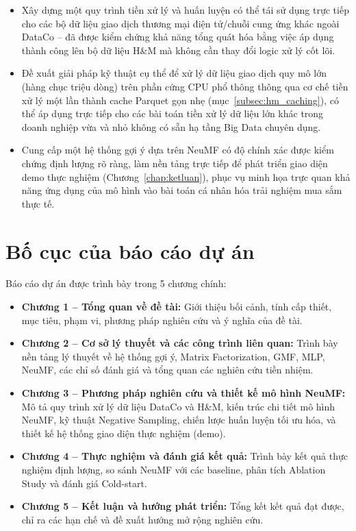 \begin{itemize}
    \item Xây dựng một quy trình tiền xử lý và huấn luyện có thể tái sử dụng trực tiếp cho các bộ dữ liệu giao dịch thương mại điện tử/chuỗi cung ứng khác ngoài DataCo -- đã được kiểm chứng khả năng tổng quát hóa bằng việc áp dụng thành công lên bộ dữ liệu H\&M mà không cần thay đổi logic xử lý cốt lõi.
    \item Đề xuất giải pháp kỹ thuật cụ thể để xử lý dữ liệu giao dịch quy mô lớn (hàng chục triệu dòng) trên phần cứng CPU phổ thông thông qua cơ chế tiền xử lý một lần thành cache Parquet gọn nhẹ (mục~\ref{subsec:hm_caching}), có thể áp dụng trực tiếp cho các bài toán tiền xử lý dữ liệu lớn khác trong doanh nghiệp vừa và nhỏ không có sẵn hạ tầng Big Data chuyên dụng.
    \item Cung cấp một hệ thống gợi ý dựa trên NeuMF có độ chính xác được kiểm chứng định lượng rõ ràng, làm nền tảng trực tiếp để phát triển giao diện demo thực nghiệm (Chương~\ref{chap:ketluan}), phục vụ minh họa trực quan khả năng ứng dụng của mô hình vào bài toán cá nhân hóa trải nghiệm mua sắm thực tế.
\end{itemize}

\section{Bố cục của báo cáo dự án}
\label{sec:bocuc}

Báo cáo dự án được trình bày trong 5 chương chính:
\begin{itemize}
    \item \textbf{Chương 1 -- Tổng quan về đề tài:} Giới thiệu bối cảnh, tính cấp thiết, mục tiêu, phạm vi, phương pháp nghiên cứu và ý nghĩa của đề tài.
    \item \textbf{Chương 2 -- Cơ sở lý thuyết và các công trình liên quan:} Trình bày nền tảng lý thuyết về hệ thống gợi ý, Matrix Factorization, GMF, MLP, NeuMF, các chỉ số đánh giá và tổng quan các nghiên cứu tiền nhiệm.
    \item \textbf{Chương 3 -- Phương pháp nghiên cứu và thiết kế mô hình NeuMF:} Mô tả quy trình xử lý dữ liệu DataCo và H\&M, kiến trúc chi tiết mô hình NeuMF, kỹ thuật Negative Sampling, chiến lược huấn luyện tối ưu hóa, và thiết kế hệ thống giao diện thực nghiệm (demo).
    \item \textbf{Chương 4 -- Thực nghiệm và đánh giá kết quả:} Trình bày kết quả thực nghiệm định lượng, so sánh NeuMF với các baseline, phân tích Ablation Study và đánh giá Cold-start.
    \item \textbf{Chương 5 -- Kết luận và hướng phát triển:} Tổng kết kết quả đạt được, chỉ ra các hạn chế và đề xuất hướng mở rộng nghiên cứu.
\end{itemize}